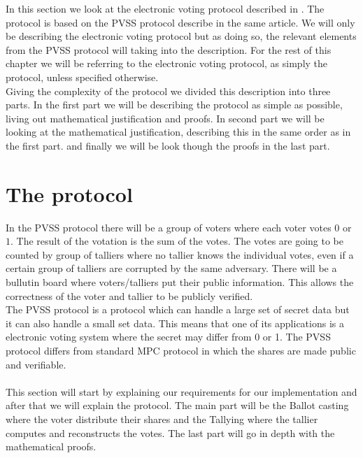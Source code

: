 In this section we look at the electronic voting protocol described in \cite{Schoenmakers1999}. The protocol is based on the PVSS protocol describe in the same article. We will only be describing the electronic voting protocol but as doing so, the relevant elements from the PVSS protocol will taking into the description. For the rest of this chapter we will be referring to the electronic voting protocol, as simply the protocol, unless specified otherwise. \\

\noindent
Giving the complexity of the protocol we divided this description into three parts. In the first part we will be describing the protocol as simple as possible, living out mathematical justification and proofs. In second part we will be looking at the mathematical justification, describing this in the same order as in the first part. and finally we will be look though the proofs in the last part. 


\section{The protocol}


\noindent
In the PVSS protocol there will be a group of voters where each voter votes $0$ or $1$. The result of the votation is the sum of the votes. The votes are going to be counted by group of talliers where no tallier knows the individual votes, even if a certain group of talliers are corrupted by the same adversary. There will be a bullutin board where voters/talliers put their public information. This allows the correctness of the voter and tallier to be publicly verified.\\

\noindent
The PVSS protocol is a protocol which can handle a large set of secret data but it can also handle a small set data. This means that one of its applications is a  electronic voting system where the secret may differ from 0 or 1. The PVSS protocol differs from standard MPC protocol in which the shares are made public and verifiable.\\\\
This section will start by explaining our requirements for our implementation and after that we will explain the protocol. The main part will be the Ballot casting where the voter distribute their shares and the Tallying where the tallier computes and reconstructs the votes. The last part will go in depth with the mathematical proofs. \\


